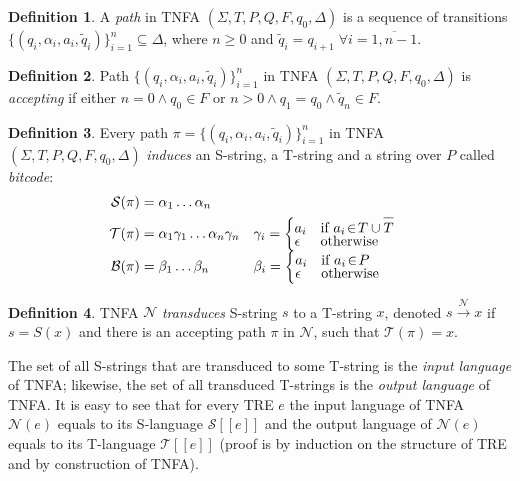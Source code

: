 \documentclass{article}
\newcommand{\Xin}{\!\in\!}
\newcommand{\Xeq}{\!=\!}
\newcommand{\Xlb}{[\![}
\newcommand{\Xrb}{]\!]}
\newcommand{\XB}{\mathcal{B}}
\newcommand{\XN}{\mathcal{N}}
\newcommand{\XS}{\mathcal{S}}
\newcommand{\XT}{\mathcal{T}}
\newcommand*{\Xbar}[1]{\overline{#1\vphantom{\bar{#1}}}}
\theoremstyle{definition}
\newtheorem{Xdef}{Definition}
\begin{document}
\begin{multicols}{2}
    \begin{Xdef}
    A \emph{path} in TNFA $(\Sigma, T, P, Q, F, q_0, \Delta)$ is a sequence of transitions
    $\{(q_i, \alpha_i, a_i, \widetilde{q}_i)\}_{i=1}^n \subseteq \Delta$, where $n \!\geq\! 0$
    and $\widetilde{q}_i \Xeq q_{i+1} \; \forall i \Xeq \overline{1,n-1}$.
    \end{Xdef}

    \begin{Xdef}
    Path $\{(q_i, \alpha_i, a_i, \widetilde{q}_i)\}_{i=1}^n$ in TNFA $(\Sigma, T, P, Q, F, q_0, \Delta)$ is \emph{accepting}
    if either $n \Xeq 0 \wedge q_0 \Xin F$ or $n\!>\!0 \wedge q_1 \Xeq q_0 \wedge \widetilde{q}_n \Xin F$.
    \end{Xdef}

    \begin{Xdef}
    Every path $\pi \Xeq \{(q_i, \alpha_i, a_i, \widetilde{q}_i)\}_{i=1}^n$
    in TNFA $(\Sigma, T, P, Q, F, q_0, \Delta)$
    \emph{induces} an S-string, a T-string and a string over $P$ called \emph{bitcode}:
    \begin{align*}
    \XS(\pi) &= \alpha_1 \dots \alpha_n \\
    \XT(\pi) &= \alpha_1 \gamma_1 \dots \alpha_n \gamma_n
    &&\gamma_i = \begin{cases}
            a_i &\text{if } a_i \Xin T \cup \Xbar{T} \\[-0.5em]
            \epsilon &\text{otherwise}
        \end{cases} \\[-0.5em]
    \XB(\pi) &= \beta_1 \dots \beta_n
    &&\beta_i = \begin{cases}
            a_i &\text{if } a_i \Xin P \\[-0.5em]
            \epsilon &\text{otherwise}
        \end{cases}
    \end{align*}
    \end{Xdef}

    \begin{Xdef}
    TNFA $\XN$ \emph{transduces} S-string $s$ to a T-string $x$, denoted $s \xrightarrow{\XN} x$
    if $s \Xeq S(x)$ and there is an accepting path $\pi$ in $\XN$, such that $\XT(\pi) \Xeq x$.
    \end{Xdef}

The set of all S-strings that are transduced to some T-string is the \emph{input language} of TNFA;
likewise, the set of all transduced T-strings is the \emph{output language} of TNFA.
It is easy to see that for every TRE $e$ the input language of TNFA $\XN(e)$ equals to its S-language $\XS \Xlb e \Xrb$
and the output language of $\XN(e)$ equals to its T-language $\XT \Xlb e \Xrb$
(proof is by induction on the structure of TRE and by construction of TNFA).
\\


\end{multicols}
\end{document}
